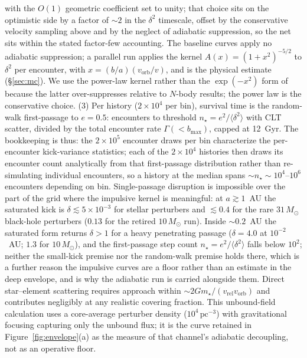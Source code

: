 \documentclass[11pt]{article}
\newcommand{\msun}{\ensuremath{M_\odot}}
\begin{document}
with the $O(1)$ geometric coefficient set to unity; that choice sits on the optimistic side by a factor of $\sim 2$ in the $\delta^{2}$ timescale, offset by the conservative velocity sampling above and by the neglect of adiabatic suppression, so the net sits within the stated factor-few accounting. The baseline curves apply no adiabatic suppression; a parallel run applies the \citet{GnedinOstriker1999} kernel $A(x) = (1+x^{2})^{-5/2}$ to $\delta^{2}$ per encounter, with $x = (b/a)(v_{\mathrm{orb}}/v)$, and is the physical estimate (\S\ref{sec:mc}). We use the power-law kernel rather than the $\exp(-x^{2})$ form of \citet{Spitzer1987} because the latter over-suppresses relative to $N$-body results; the power law is the conservative choice. (3) Per history ($2\times10^{4}$ per bin), survival time is the random-walk first-passage to $e = 0.5$: encounters to threshold $n_{\star} = e^{2}/\langle\delta^{2}\rangle$ with CLT scatter, divided by the total encounter rate $\Gamma(<b_{\max})$, capped at 12~Gyr. The bookkeeping is thus: the $2\times10^{5}$ encounter draws per bin characterize the per-encounter kick-variance statistics; each of the $2\times10^{4}$ histories then draws its encounter count analytically from that first-passage distribution rather than re-simulating individual encounters, so a history at the median spans $\sim n_{\star} \sim 10^{4}$--$10^{6}$ encounters depending on bin. Single-passage disruption is impossible over the part of the grid where the impulsive kernel is meaningful: at $a \gtrsim 1$~AU the saturated kick is $\delta \lesssim 5\times10^{-3}$ for stellar perturbers and $\lesssim 0.4$ for the rare $31\,\msun$ black-hole perturbers ($0.13$ for the retired $10\,\msun$ run). Inside $\sim 0.2$~AU the saturated form returns $\delta > 1$ for a heavy penetrating passage ($\delta = 4.0$ at $10^{-2}$~AU; $1.3$ for $10\,\msun$), and the first-passage step count $n_{\star} = e^{2}/\langle\delta^{2}\rangle$ falls below $10^{2}$; neither the small-kick premise nor the random-walk premise holds there, which is a further reason the impulsive curves are a floor rather than an estimate in the deep envelope, and is why the adiabatic run is carried alongside them. Direct star--element scattering requires approach within $\sim 2Gm_{\star}/(v_{\mathrm{rel}}v_{\mathrm{orb}})$ and contributes negligibly at any realistic covering fraction. This unbound-field calculation uses a core-average perturber density ($10^{4}\,\mathrm{pc^{-3}}$) with gravitational focusing capturing only the unbound flux; it is the curve retained in Figure~\ref{fig:envelope}(a) as the measure of that channel's adiabatic decoupling, not as an operative floor.
\end{document}
